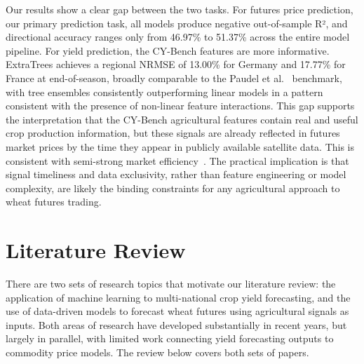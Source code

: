 \documentclass[pdflatex,sn-mathphys-num, oneside, 11pt]{sn-jnl}%
\theoremstyle{thmstyleone}%
\theoremstyle{thmstyletwo}%
\theoremstyle{thmstylethree}%
\begin{document}
Our results show a clear gap between the two tasks. For futures price prediction, our primary prediction task, all models produce negative out-of-sample R², and directional accuracy ranges only from 46.97\% to 51.37\% across the entire model pipeline. For yield prediction, the CY-Bench features are more informative. ExtraTrees achieves a regional NRMSE of 13.00\% for Germany and 17.77\% for France at end-of-season, broadly comparable to the Paudel et al.~\cite{bib16} benchmark, with tree ensembles consistently outperforming linear models in a pattern consistent with the presence of non-linear feature interactions. This gap supports the interpretation that the CY-Bench agricultural features contain real and useful crop production information, but these signals are already reflected in futures market prices by the time they appear in publicly available satellite data. This is consistent with semi-strong market efficiency~\cite{bib30}. The practical implication is that signal timeliness and data exclusivity, rather than feature engineering or model complexity, are likely the binding constraints for any agricultural approach to wheat futures trading.

\section{Literature Review}\label{lit_review}

There are two sets of research topics that motivate our literature review: the application of machine learning to multi-national crop yield forecasting, and the use of data-driven models to forecast wheat futures using agricultural signals as inputs. Both areas of research have developed substantially in recent years, but largely in parallel, with limited work connecting yield forecasting outputs to commodity price models. The review below covers both sets of papers.\\
 
\end{document}
